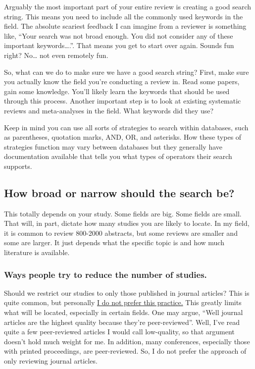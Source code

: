 \documentclass[
]{book}
\begin{document}
Arguably the most important part of your entire review is creating a good search string. This means you need to include all the commonly used keywords in the field. The absolute scariest feedback I can imagine from a reviewer is something like, ``Your search was not broad enough. You did not consider any of these important keywords\ldots.''. That means you get to start over again. Sounds fun right? No\ldots{} not even remotely fun.

So, what can we do to make sure we have a good search string? First, make sure you actually know the field you're conducting a review in. Read some papers, gain some knowledge. You'll likely learn the keywords that should be used through this process. Another important step is to look at existing systematic reviews and meta-analyses in the field. What keywords did they use?

Keep in mind you can use all sorts of strategies to search within databases, such as parentheses, quotation marks, AND, OR, and asterisks. How these types of strategies function may vary between databases but they generally have documentation available that tells you what types of operators their search supports.

\hypertarget{how-broad-or-narrow-should-the-search-be}{%
\subsection{How broad or narrow should the search be?}\label{how-broad-or-narrow-should-the-search-be}}

This totally depends on your study. Some fields are big. Some fields are small. That will, in part, dictate how many studies you are likely to locate. In my field, it is common to review 800-2000 abstracts, but some reviews are smaller and some are larger. It just depends what the specific topic is and how much literature is available.

\hypertarget{ways-people-try-to-reduce-the-number-of-studies.}{%
\subsubsection{Ways people try to reduce the number of studies.}\label{ways-people-try-to-reduce-the-number-of-studies.}}

Should we restrict our studies to only those published in journal articles? This is quite common, but personally \ul{I do not prefer this practice.} This greatly limits what will be located, especially in certain fields. One may argue, ``Well journal articles are the highest quality because they're peer-reviewed''. Well, I've read quite a few peer-reviewed articles I would call low-quality, so that argument doesn't hold much weight for me. In addition, many conferences, especially those with printed proceedings, are peer-reviewed. So, I do not prefer the approach of only reviewing journal articles.
\end{document}
